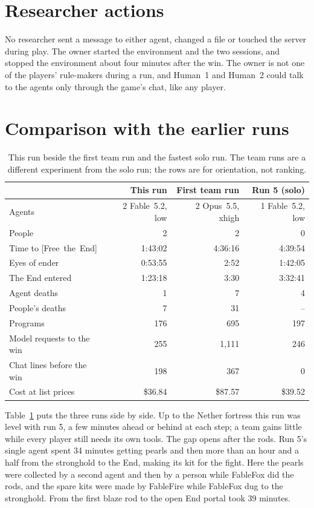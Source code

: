 \documentclass[11pt,a4paper]{article}
\newcommand{\adv}[1]{\mbox{\textsf{[#1]}}}
\begin{document}
\section{Researcher actions}
\label{sec:researcher}

No researcher sent a message to either agent, changed a file or touched the server during play. The owner started the environment and the two sessions, and stopped the environment about four minutes after the win. The owner is not one of the players' rule-makers during a run, and Human~1 and Human~2 could talk to the agents only through the game's chat, like any player.

\section{Comparison with the earlier runs}
\label{sec:compare}

\begin{table}[t]
  \caption{This run beside the first team run and the fastest solo run. The team runs are a different experiment from the solo run; the rows are for orientation, not ranking.}
  \label{tab:compare}
  \small
  \begin{tabularx}{\textwidth}{@{}Xrrr@{}}
    \toprule
    & \textbf{This run} & \textbf{First team run} & \textbf{Run 5 (solo)} \\
    \midrule
    Agents & 2 Fable~5.2, low & 2 Opus~5.5, xhigh & 1 Fable~5.2, low \\
    People & 2 & 2 & 0 \\
    Time to \adv{Free the End} & 1:43:02 & 4:36:16 & 4:39:54 \\
    Eyes of ender & 0:53:55 & 2:52 & 1:42:05 \\
    The End entered & 1:23:18 & 3:30 & 3:32:41 \\
    Agent deaths & 1 & 7 & 4 \\
    People's deaths & 7 & 31 & -- \\
    Programs & 176 & 695 & 197 \\
    Model requests to the win & 255 & 1,111 & 246 \\
    Chat lines before the win & 198 & 367 & 0 \\
    Cost at list prices & \$36.84 & \$87.57 & \$39.52 \\
    \bottomrule
  \end{tabularx}
\end{table}

Table~\ref{tab:compare} puts the three runs side by side. Up to the Nether fortress this run was level with run 5, a few minutes ahead or behind at each step; a team gains little while every player still needs its own tools. The gap opens after the rods. Run 5's single agent spent 34 minutes getting pearls and then more than an hour and a half from the stronghold to the End, making its kit for the fight. Here the pearls were collected by a second agent and then by a person while FableFox did the rods, and the spare kits were made by FableFire while FableFox dug to the stronghold. From the first blaze rod to the open End portal took 39 minutes.
\end{document}
